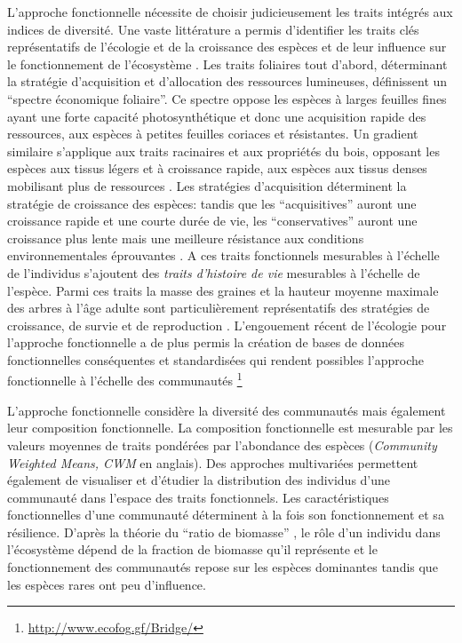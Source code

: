\documentclass[
  11pt,
  french,
  A4paper,
  extrafontsizes,onecolumn,openright
  ]{memoir}
\begin{document}
L'approche fonctionnelle nécessite de choisir judicieusement les traits
intégrés aux indices de diversité. Une vaste littérature a permis
d'identifier les traits clés représentatifs de l'écologie et de la
croissance des espèces et de leur influence sur le fonctionnement de
l'écosystème \autocite{Reich2014}. Les traits foliaires tout d'abord,
déterminant la stratégie d'acquisition et d'allocation des ressources
lumineuses, définissent un ``spectre économique foliaire''. Ce spectre
oppose les espèces à larges feuilles fines ayant une forte capacité
photosynthétique et donc une acquisition rapide des ressources, aux
espèces à petites feuilles coriaces et résistantes. Un gradient
similaire s'applique aux traits racinaires et aux propriétés du bois,
opposant les espèces aux tissus légers et à croissance rapide, aux
espèces aux tissus denses mobilisant plus de ressources
\autocites{Chave2009}{Valverde-Barrantes2017}. Les stratégies
d'acquisition déterminent la stratégie de croissance des espèces: tandis
que les ``acquisitives'' auront une croissance rapide et une courte
durée de vie, les ``conservatives'' auront une croissance plus lente
mais une meilleure résistance aux conditions environnementales
éprouvantes \autocites{Reich1997}{Wright2004}. A ces traits fonctionnels
mesurables à l'échelle de l'individus s'ajoutent des \emph{traits
d'histoire de vie} mesurables à l'échelle de l'espèce. Parmi ces traits
la masse des graines et la hauteur moyenne maximale des arbres à l'âge
adulte sont particulièrement représentatifs des stratégies de
croissance, de survie et de reproduction
\autocites{Westoby1998}{Herault2011}. L'engouement récent de l'écologie
pour l'approche fonctionnelle a de plus permis la création de bases de
données fonctionnelles conséquentes et standardisées qui rendent
possibles l'approche fonctionnelle à l'échelle des communautés
\autocites{Kattge2011}{Perez-Harguindeguy2013} \footnote{\url{http://www.ecofog.gf/Bridge/}}

L'approche fonctionnelle considère la diversité des communautés mais
également leur composition fonctionnelle. La composition fonctionnelle
est mesurable par les valeurs moyennes de traits pondérées par
l'abondance des espèces (\emph{Community Weighted Means, CWM} en
anglais). Des approches multivariées permettent également de visualiser
et d'étudier la distribution des individus d'une communauté dans
l'espace des traits fonctionnels. Les caractéristiques fonctionnelles
d'une communauté déterminent à la fois son fonctionnement et sa
résilience. D'après la théorie du ``ratio de biomasse''
\autocite{Grime1998}, le rôle d'un individu dans l'écosystème dépend de
la fraction de biomasse qu'il représente et le fonctionnement des
communautés repose sur les espèces dominantes tandis que les espèces
rares ont peu d'influence.
\end{document}

